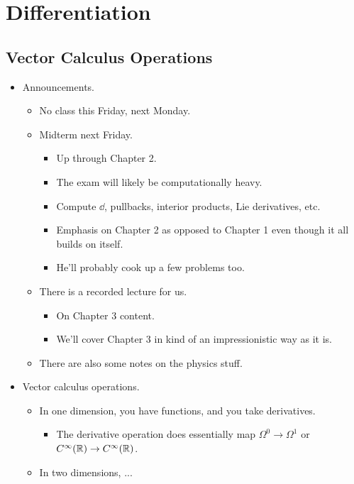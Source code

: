 \documentclass[../notes.tex]{subfiles}
\begin{document}
\chapter{Differentiation}
\section{Vector Calculus Operations}
\begin{itemize}
    \item {}Announcements.
    \begin{itemize}
        \item No class this Friday, next Monday.
        \item Midterm next Friday.
        \begin{itemize}
            \item Up through Chapter 2.
            \item The exam will likely be computationally heavy.
            \item Compute $\dd$, pullbacks, interior products, Lie derivatives, etc.
            \item Emphasis on Chapter 2 as opposed to Chapter 1 even though it all builds on itself.
            \item He'll probably cook up a few problems too.
        \end{itemize}
        \item There is a recorded lecture for us.
        \begin{itemize}
            \item On Chapter 3 content.
            \item We'll cover Chapter 3 in kind of an impressionistic way as it is.
        \end{itemize}
        \item There are also some notes on the physics stuff.
    \end{itemize}
    \item Vector calculus operations.
    \begin{itemize}
        \item In one dimension, you have functions, and you take derivatives.
        \begin{itemize}
            \item The derivative operation does essentially map $\Omega^0\to\Omega^1$ or $C^\infty(\mathbb{R})\to C^\infty(\mathbb{R})$.
        \end{itemize}
        \item In two dimensions, ...

\end{itemize}
\end{itemize}
\end{document}
